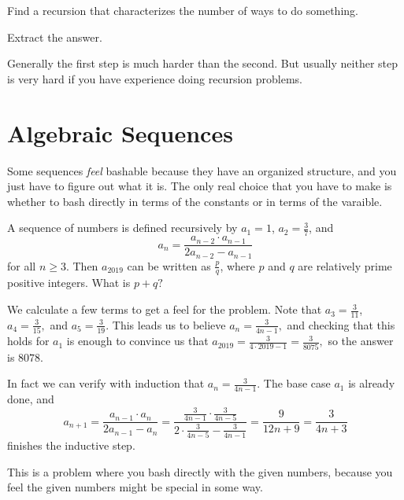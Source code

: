 \documentclass[blue,onecol]{shooting}
\begin{document}
\begin{itemize}

\Item Find a recursion that characterizes the number of ways to do something.

\Item Extract the answer.

\end{itemize}

Generally the first step is much harder than the second. But usually neither step is very hard if you have experience doing recursion problems.

\section{Algebraic Sequences}

Some sequences \textit{feel} bashable because they have an organized structure, and you just have to figure out what it is. The only real choice that you have to make is whether to bash directly in terms of the constants or in terms of the varaible.

\begin{exam}[AMC 10A 2019/15]
A sequence of numbers is defined recursively by $a_1 = 1$, $a_2 = \frac{3}{7}$, and
    \[a_n=\frac{a_{n-2} \cdot a_{n-1}}{2a_{n-2} - a_{n-1}}\]
    for all $n \geq 3$. Then $a_{2019}$ can be written as $\frac{p}{q}$, where $p$ and $q$ are relatively prime positive integers. What is $p+q?$
\end{exam}
\begin{sol}
We calculate a few terms to get a feel for the problem. Note that $a_3=\frac{3}{11}$, $a_4=\frac{3}{15},$ and $a_5=\frac{3}{19}.$ This leads us to believe $a_n=\frac{3}{4n-1},$ and checking that this holds for $a_1$ is enough to convince us that $a_{2019}=\frac{3}{4\cdot 2019-1}=\frac{3}{8075},$ so the answer is $8078.$

In fact we can verify with induction that $a_n=\frac{3}{4n-1}.$ The base case $a_1$ is already done, and \[a_{n+1}=\frac{a_{n-1}\cdot a_n}{2a_{n-1}-a_n}=\frac{\frac{3}{4n-1}\cdot\frac{3}{4n-5}}{2\cdot \frac{3}{4n-5}-\frac{3}{4n-1}}=\frac{9}{12n+9}=\frac{3}{4n+3}\] finishes the inductive step.
\end{sol}
This is a problem where you bash directly with the given numbers, because you feel the given numbers might be special in some way.
\end{document}
